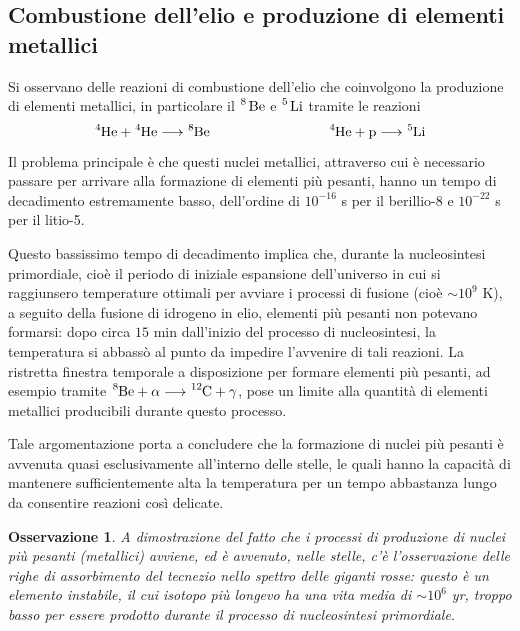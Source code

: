 \documentclass[11pt, a4paper]{scrartcl}
\theoremstyle{style}
\newtheorem{osservazione}{Osservazione}[section]
\theoremstyle{style1}
\numberwithin{equation}{subsection}
\begin{document}
\subsection{Combustione dell'elio e produzione di elementi metallici}

Si osservano delle reazioni di combustione dell'elio che coinvolgono la produzione di elementi metallici, in particolare il $\ce{^{8} Be}$ e $\ce{^{5} Li}$ tramite le reazioni
\[
	\ce{^{4}He + ^{4}He } \longrightarrow \ce{^{8}Be} \hspace{3cm} \ce{^{4}He + p}\longrightarrow \ce{^{5}Li}
\] 
Il problema principale \`e che questi nuclei metallici, attraverso cui \`e necessario passare per arrivare alla formazione di elementi pi\`u pesanti, hanno un tempo di decadimento estremamente basso, dell'ordine di $10^{-16} $ s per il berillio-8 e $10^{-22} $ s per il litio-5.

Questo bassissimo tempo di decadimento implica che, durante la nucleosintesi primordiale, cio\`e il periodo di iniziale espansione dell'universo in cui si raggiunsero temperature ottimali per avviare i processi di fusione (cio\`e $\sim 10^9$ K), a seguito della fusione di idrogeno in elio, elementi pi\`u pesanti non potevano formarsi: dopo circa $15$ min dall'inizio del processo di nucleosintesi, la temperatura si abbass\`o al punto da impedire l'avvenire di tali reazioni.
La ristretta finestra temporale a disposizione per formare elementi pi\`u pesanti, ad esempio tramite $\ce{^{8}Be + \alpha } \longrightarrow \ce{^{12}C +\gamma} $, pose un limite alla quantit\`a di elementi metallici producibili durante questo processo.

Tale argomentazione porta a concludere che la formazione di nuclei pi\`u pesanti \`e avvenuta quasi esclusivamente all'interno delle stelle, le quali hanno la capacit\`a di mantenere sufficientemente alta la temperatura per un tempo abbastanza lungo da consentire reazioni cos\`i delicate.

\begin{osservazione}
A dimostrazione del fatto che i processi di produzione di nuclei pi\`u pesanti (metallici) avviene, ed \`e avvenuto, nelle stelle, c'\`e l'osservazione delle righe di assorbimento del tecnezio nello spettro delle giganti rosse: questo \`e un elemento instabile, il cui isotopo pi\`u longevo ha una vita media di $\sim 10^{6}$ yr, troppo basso per essere prodotto durante il processo di nucleosintesi primordiale.
\end{osservazione}
\end{document}
